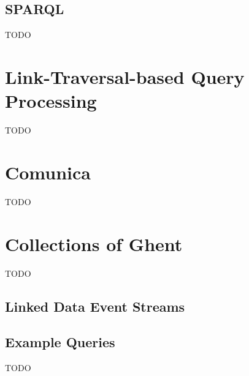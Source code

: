 \subsection{SPARQL}
\label{subsec:sparql}

TODO

\section{Link-Traversal-based Query Processing}
\label{sec:ltqp}

TODO

\section{Comunica}
\label{sec:comunica}

TODO

\section{Collections of Ghent}
\label{sec:coghent}

TODO

\subsection{Linked Data Event Streams}
\label{subsec:ldes}

\subsection{Example Queries}
\label{sec:coghent_example_queries}

TODO

